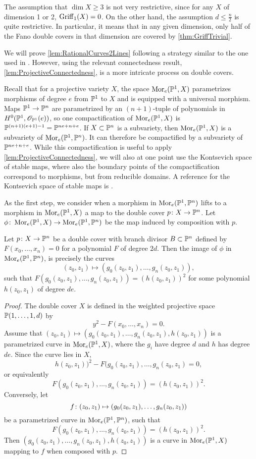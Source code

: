 \begin{remark}
The assumption that $\dim X \geq 3$ is not very restrictive, since for any $X$ of dimension 1 or 2, $\Griff_1(X) = 0$. On the other hand, the assumption $d \leq \frac{n}{2}$ is quite restrictive. In particular, it means that in any given dimension, only half of the Fano double covers in that dimension are covered by \cref{thm:GriffTrivial}.
\end{remark}


We will prove \cref{lem:RationalCurves2Lines} following a strategy similar to the one used in \cite[Theorem 6.2]{TZ}. However, using the relevant connectedness result, \cref{lem:ProjectiveConnectedness}, is a more intricate process on double covers.

Recall that for a projective variety $X$, the space $\Mor_e(\P^1,X)$ parametrizes morphisms of degree $e$ from $\P^1$ to $X$ and is equipped with a universal morphism. Maps $\P^1 \to \P^n$ are parametrized by an $(n+1)$-tuple of polynomials in $H^0(\P^1,\sO_{\P^1}(e))$, so one compactification of $\Mor_e(\P^1,X)$ is $\P^{(n+1)(e+1)-1}=\P^{ne+n+e}$. If $X \subset \P^n$ is a subvariety, then $\Mor_e(\P^1,X)$ is a subvariety of $\Mor_e(\P^1,\P^n)$. It can therefore be compactified by a subvariety of $\P^{ne+n+e}$. While this compactification is useful to apply \cref{lem:ProjectiveConnectedness}, we will also at one point use the Kontsevich space of stable maps, where also the boundary points of the compactification correspond to morphisms, but from reducible domains. A reference for the Kontsevich space of stable maps is \cite{FP}.

As the first step, we consider when a morphism in $\Mor_e(\P^1, \P^n)$ lifts to a morphism in $\Mor_e(\P^1,X)$ \ie a map to the double cover $p \from X \to \P^n$. Let $\phi \from \Mor_e(\P^1,X) \to \Mor_e(\P^1,\P^n)$ be the map induced by composition with $p$.
\begin{lemma}
\label{lem:RationalCurveLift}
  Let $p \from X \to \P^n$ be a double cover with branch divisor $B \subset \P^n$ defined by $F(x_0,\dots,x_n) = 0$ for a polynomial $F$ of degree $2d$. Then the image of $\phi$ in $\Mor_e(\P^1,\P^n)$, is precisely the curves
\[(z_0,z_1) \mapsto (g_0(z_0,z_1),\dots,g_n(z_0,z_1)),\]
such that $F(g_0(z_0,z_1),\dots,g_n(z_0,z_1)) = (h(z_0,z_1))^2$ for some polynomial $h(z_0,z_1)$ of degree $de$.
\end{lemma}
\begin{proof}
  The double cover $X$ is defined in the weighted projective space $\P(1,\dots,1,d)$ by 
\[y^2 - F(x_0,\dots,x_n) = 0.\]
 Assume that $(z_0,z_1) \mapsto (g_0(z_0,z_1),\dots,g_n(z_0,z_1),h(z_0,z_1))$ is a parametrized curve in $\Mor_e(\P^1,X)$, where the $g_i$ have degree $d$ and $h$ has degree $de$. Since the curve lies in $X$, 
\[h(z_0,z_1))^2 - F(g_0(z_0,z_1),\dots,g_n(z_0,z_1) = 0,\]
or equivalently 
\[F(g_0(z_0,z_1),\dots,g_n(z_0,z_1)) = (h(z_0,z_1))^2.\]
Conversely, let 
\[ f \from (z_0,z_1) \mapsto (g_0(z_0,z_1),\dots,g_n(z_0,z_1))\]
 be a parametrized curve in $\Mor_e(\P^1,\P^n)$, such that 
\[F(g_0(z_0,z_1),\dots,g_n(z_0,z_1)) = (h(z_0,z_1))^2.\] Then 
$(g_0(z_0,z_1),\dots,g_n(z_0,z_1),h(z_0,z_1))$ is a curve in $\Mor_e(\P^1,X)$ mapping to $f$ when composed with $p$.
\end{proof}

